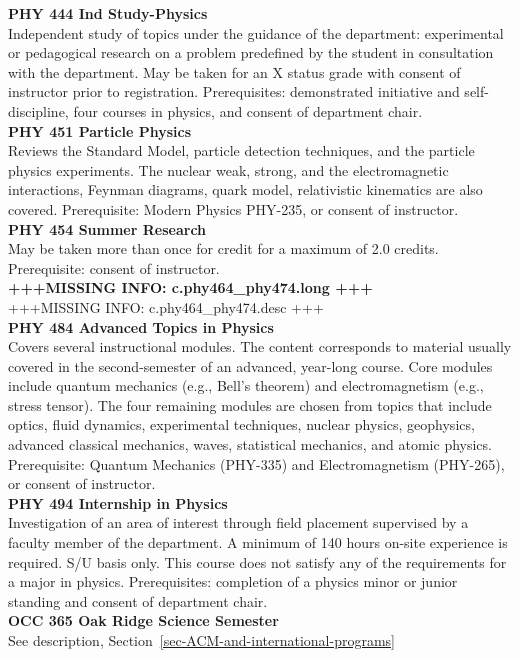 \documentclass[
  letterpaper,
]{scrbook}
\begin{document}
\textbf{PHY 444 Ind Study-Physics}\\
Independent study of topics under the guidance of the department:
experimental or pedagogical research on a problem predefined by the
student in consultation with the department. May be taken for an X
status grade with consent of instructor prior to registration.
Prerequisites: demonstrated initiative and self-discipline, four courses
in physics, and consent of department chair.\\
\textbf{PHY 451 Particle Physics}\\
Reviews the Standard Model, particle detection techniques, and the
particle physics experiments. The nuclear weak, strong, and the
electromagnetic interactions, Feynman diagrams, quark model,
relativistic kinematics are also covered. Prerequisite: Modern Physics
PHY-235, or consent of instructor.\\
\textbf{PHY 454 Summer Research}\\
May be taken more than once for credit for a maximum of 2.0 credits.
Prerequisite: consent of instructor.\\
\textbf{+++MISSING INFO: c.phy464\_phy474.long +++}\\
+++MISSING INFO: c.phy464\_phy474.desc +++\\
\textbf{PHY 484 Advanced Topics in Physics}\\
Covers several instructional modules. The content corresponds to
material usually covered in the second-semester of an advanced,
year-long course. Core modules include quantum mechanics (e.g., Bell's
theorem) and electromagnetism (e.g., stress tensor). The four remaining
modules are chosen from topics that include optics, fluid dynamics,
experimental techniques, nuclear physics, geophysics, advanced classical
mechanics, waves, statistical mechanics, and atomic physics.
Prerequisite: Quantum Mechanics (PHY-335) and Electromagnetism
(PHY-265), or consent of instructor.\\
\textbf{PHY 494 Internship in Physics}\\
Investigation of an area of interest through field placement supervised
by a faculty member of the department. A minimum of 140 hours on-site
experience is required. S/U basis only. This course does not satisfy any
of the requirements for a major in physics. Prerequisites: completion of
a physics minor or junior standing and consent of department chair.\\
\textbf{OCC 365 Oak Ridge Science Semester}\\
See description, Section~\ref{sec-ACM-and-international-programs}
\end{document}
